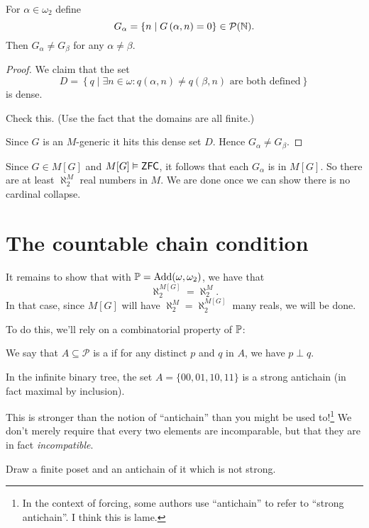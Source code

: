 \begin{lemma}
	For $\alpha \in \omega_2$ define
	\[ G_\alpha = \left\{ n \mid G\left( \alpha,n \right) = 0 \right\} \in \mathcal P(\mathbb N). \]
	Then $G_\alpha \neq G_\beta$ for any $\alpha \neq \beta$.
\end{lemma}
\begin{proof}
	We claim that the set
	\[ D = \left\{ q \mid \exists n \in \omega :
		q\left( \alpha, n \right) \neq q\left( \beta, n \right)
		\text{ are both defined}
	\right\} \]
	is dense.
	\begin{ques}
		Check this.
		(Use the fact that the domains are all finite.)
	\end{ques}

	Since $G$ is an $M$-generic it hits this dense set $D$.
	Hence $G_\alpha \neq G_\beta$.
\end{proof}

Since $G \in M[G]$ and $M[G] \vDash \mathsf{ZFC}$,
it follows that each $G_\alpha$ is in $M[G]$.
So there are at least $\aleph_2^M$ real numbers in $M$.
We are done once we can show there is no cardinal collapse.

\section{The countable chain condition}
It remains to show that with $\mathbb P = \operatorname{Add}(\omega, \omega_2)$, we have that
\[ \aleph_2^{M[G]} = \aleph_2^M. \]
In that case, since $M[G]$ will have $\aleph_2^M = \aleph_2^{M[G]}$ many reals, we will be done.

To do this, we'll rely on a combinatorial property of $\mathbb P$:
\begin{definition}
	We say that $A \subseteq \mathcal P$ is a 
	if for any distinct $p$ and $q$ in $A$, we have $p \perp q$.
\end{definition}
\begin{example}
	In the infinite binary tree, 
	the set $A = \{00, 01, 10, 11\}$ is a strong antichain
	(in fact maximal by inclusion).
\end{example}
This is stronger than the notion of ``antichain'' than you might be used to!\footnote{%
	In the context of forcing, some authors use ``antichain'' to refer to ``strong antichain''.
	I think this is lame.}
We don't merely require that every two elements are incomparable,
but that they are in fact \emph{incompatible}.
\begin{ques}
	Draw a finite poset and an antichain of it which is not strong.
\end{ques}

